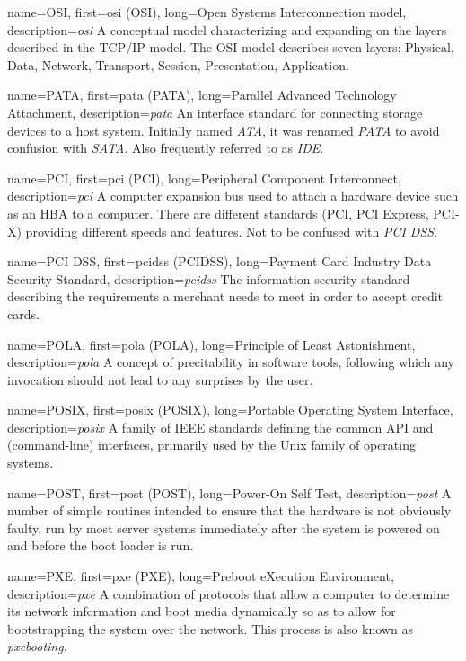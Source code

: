 {
	name={OSI},
	first={\acrlong{osi} (OSI)},
	long={Open Systems Interconnection model},
	description={{\em \acrlong{osi}} A conceptual
model characterizing and expanding on the layers
described in the TCP/IP model.  The OSI model
describes seven layers: Physical, Data, Network,
Transport, Session, Presentation, Application.}
}

{
	name={PATA},
	first={\acrlong{pata} (PATA)},
	long={Parallel Advanced Technology Attachment},
	description={{\em \acrlong{pata}} An interface
standard for connecting storage devices to a host system.  Initially named
{\em ATA}, it was renamed {\em PATA} to avoid confusion with {\em SATA}.
Also frequently referred to as {\em IDE}.}
}

{
	name={PCI},
	first={\acrlong{pci} (PCI)},
	long={Peripheral Component Interconnect},
	description={{\em \acrlong{pci}} A computer expansion bus
used to attach a hardware device such as an HBA to a computer.  There are
different standards (PCI, PCI Express, PCI-X) providing different speeds
and features. Not to be confused with {\em PCI DSS}.}
}

{
	name={PCI DSS},
	first={\acrlong{pcidss} (PCIDSS)},
	long={Payment Card Industry Data Security Standard},
	description={{\em \acrlong{pcidss}} The
information security standard describing the requirements a merchant needs
to meet in order to accept credit cards.}
}

{
	name={POLA},
	first={\acrlong{pola} (POLA)},
	long={Principle of Least Astonishment},
	description={{\em \acrlong{pola}} A concept of
precitability in software tools, following which any invocation should not
lead to any surprises by the user.}
}

{
	name={POSIX},
	first={\acrlong{posix} (POSIX)},
	long={Portable Operating System Interface},
	description={{\em \acrlong{posix}} A family of IEEE
standards defining the common API and (command-line) interfaces, primarily
used by the Unix family of operating systems.}
}

{
	name={POST},
	first={\acrlong{post} (POST)},
	long={Power-On Self Test},
	description={{\em \acrlong{post}} A number of simple routines intended
to ensure that the hardware is not obviously faulty, run by most server
systems immediately after the system is powered on and before the boot
loader is run.}
}

{
	name={PXE},
	first={\acrlong{pxe} (PXE)},
	long={Preboot eXecution Environment},
	description={{\em \acrlong{pxe}} A combination of protocols
that allow a computer to determine its network information and boot media
dynamically so as to allow for bootstrapping the system over the network.
This process is also known as {\em pxebooting}.}
}

